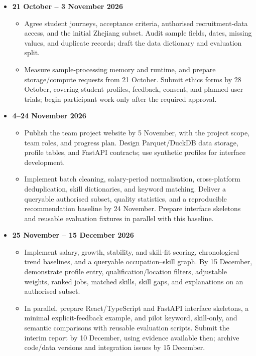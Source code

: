 \documentclass[a4paper,12pt]{article}
\begin{document}
\begin{itemize}
  \item \textbf{21 October -- 3 November 2026}
    \begin{itemize}
      \item Agree student journeys, acceptance criteria, authorised recruitment-data access, and the initial Zhejiang subset. Audit sample fields, dates, missing values, and duplicate records; draft the data dictionary and evaluation split.
      \item Measure sample-processing memory and runtime, and prepare storage/compute requests from 21 October. Submit ethics forms by 28 October, covering student profiles, feedback, consent, and planned user trials; begin participant work only after the required approval.
    \end{itemize}

  \item \textbf{4--24 November 2026}
    \begin{itemize}
      \item Publish the team project website by 5 November, with the project scope, team roles, and progress plan. Design Parquet/DuckDB data storage, profile tables, and FastAPI contracts; use synthetic profiles for interface development.
      \item Implement batch cleaning, salary-period normalisation, cross-platform deduplication, skill dictionaries, and keyword matching. Deliver a queryable authorised subset, quality statistics, and a reproducible recommendation baseline by 24 November. Prepare interface skeletons and reusable evaluation fixtures in parallel with this baseline.
    \end{itemize}

  \item \textbf{25 November -- 15 December 2026}
    \begin{itemize}
      \item Implement salary, growth, stability, and skill-fit scoring, chronological trend baselines, and a queryable occupation--skill graph. By 15 December, demonstrate profile entry, qualification/location filters, adjustable weights, ranked jobs, matched skills, skill gaps, and explanations on an authorised subset.
      \item In parallel, prepare React/TypeScript and FastAPI interface skeletons, a minimal explicit-feedback example, and pilot keyword, skill-only, and semantic comparisons with reusable evaluation scripts. Submit the interim report by 10 December, using evidence available then; archive code/data versions and integration issues by 15 December.
    \end{itemize}


\end{itemize}
\end{document}
